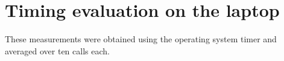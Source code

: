 \chapter{Timing evaluation on the laptop}\label{sec:appendix_laptop}
These measurements were obtained using the operating system timer and averaged over ten calls each.
